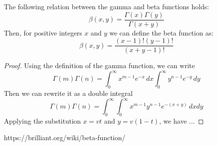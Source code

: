 \begin{prop}
    The following relation between the gamma and beta functions holds:
    \[
        \beta(x, y) = \frac{\Gamma(x) \Gamma(y)}{\Gamma(x + y)}
    \]
    Then, for positive integers $x$ and $y$ we can define the beta function as:
    \[
        \beta(x, y) = \frac{(x - 1)! (y - 1)!}{(x + y - 1)!}
    \]
\end{prop}
\begin{proof}
    Using the definition of the gamma function, we can write
    \[
        \Gamma(m)\Gamma(n) = \int_0^\infty x^{m - 1} e^{-x} \, dx \int_0^\infty y^{n - 1} e^{-y} \, dy
    \]
    Then we can rewrite it as a double integral
    \[
        \Gamma(m)\Gamma(n) = \int_0^\infty \int_0^\infty x^{m - 1} y^{n - 1} e^{-(x + y)} \, dx dy
    \]
    Applying the substitution $x = vt$ and $y = v(1 - t)$, we have
    ...
\end{proof}

https://brilliant.org/wiki/beta-function/
